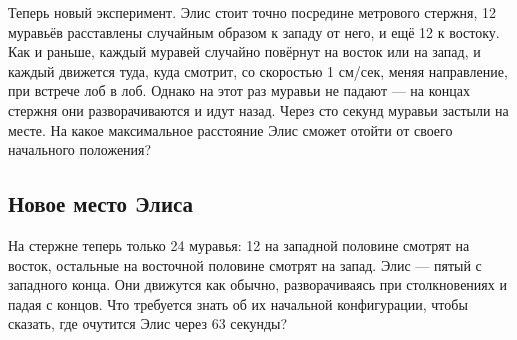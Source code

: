 Теперь новый эксперимент.
Элис стоит точно посредине метрового стержня, 12 муравьёв расставлены случайным образом к западу от него, и ещё 12 к востоку.
Как и раньше, каждый муравей случайно повёрнут на восток или на запад, и каждый движется туда, куда смотрит, со скоростью 1 см/сек, меняя направление, при встрече лоб в лоб.
Однако на этот раз муравьи не падают ---
на концах стержня они разворачиваются и идут назад.
Через сто секунд муравьи застыли на месте.
На какое максимальное расстояние Элис сможет отойти от своего начального положения?

\subsection*{Новое место Элиса}

На стержне теперь только 24 муравья:
12 на западной половине смотрят на восток,
остальные на восточной половине смотрят на запад.
Элис --- пятый с западного конца.
Они движутся как обычно, разворачиваясь при столкновениях и падая с концов.
Что требуется знать об их начальной конфигурации, чтобы сказать, где очутится Элис через 63 секунды?
